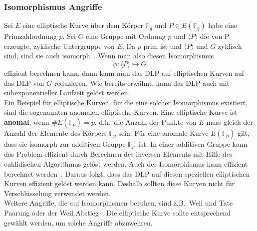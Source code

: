 \documentclass[hidelinks]{article}
\theoremstyle{plain}
\theoremstyle{definition}
\theoremstyle{rem}
\begin{document}
\begin{sloppypar}
\subsubsection{Isomorphismus Angriffe}
Sei $E$ eine elliptische Kurve über dem Körper $\mathbb{F}_q$ und $P \in E(\mathbb{F}_q)$ habe eine Primzahlordnung $p$. Sei $G$ eine Gruppe mit Ordnung $p$ und $\langle P \rangle$ die von P erzeugte, zyklische Untergruppe von $E$. Da $p$ prim ist und $\langle P \rangle$ und $G$ zyklisch sind, sind sie auch isomorph~\cite[Seite~168]{hankersonguide}. Wenn man also diesen Isomorphismus 
\begin{equation*}
    \phi : \langle P \rangle \mapsto G
\end{equation*}
effizient berechnen kann, dann kann man das DLP auf elliptischen Kurven auf das DLP von $G$ reduzieren. Wie bereits erwähnt, kann das DLP auch mit subexponentieller Laufzeit gelöst werden. \\ 
\newline
Ein Beispiel für elliptische Kurven, für die eine solcher Isomorphismus existiert, sind die sogenannten anomalen elliptische Kurven. Eine elliptische Kurve ist \textbf{anomal}, wenn $\#E(\mathbb{F}_p) = p$, d.h.\ die Anzahl der Punkte von $E$ muss gleich der Anzahl der Elemente des Körpers $\mathbb{F}_p$ sein. 
Für eine anomale Kurve $E(\mathbb{F}_p)$ gilt, dass sie isomorph zur additiven Gruppe $\mathbb{F}^+_p$ ist. In einer additiven Gruppe kann das Problem effizient durch Berechnen des inversen Elements mit Hilfe des euklidischen Algorithmus gelöst werden.
Auch der Isomorphismus kann effizient berechnet werden~\cite[Seite~168]{hankersonguide}. Daraus folgt, dass das DLP auf diesen speziellen elliptischen Kurven effizient gelöst werden kann.
Deshalb sollten diese Kurven nicht für Verschlüsselung verwendet werden. \\
\newline
Weitere Angriffe, die auf Isomorphismen beruhen, sind z.B.\ Weil und Tate Paarung oder der Weil Abstieg~\cite[Seite~169-170]{hankersonguide}. Die elliptische Kurve sollte entsprechend gewählt werden, um solche Angriffe abzuwehren.


\end{sloppypar}
\end{document}
